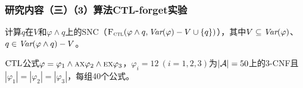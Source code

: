\documentclass[aspectratio=1610, 9pt, CJK]{beamer}
\begin{document}
\begin{frame}
	\frametitle{研究内容（三）（3）算法CTL-forget实验}
		\textcolor{blue!60}{计算$q$在$V$和$\varphi \wedge q$上的SNC（${\textsc{F}_{\textsc{ctl}}}(\varphi\wedge q, \textit{Var}(\varphi)-V \cup \{q\})$），其中$V\subseteq \textit{Var}(\varphi)$、$q\in \textit{Var}(\varphi\wedge q)-V$。}
		
		$\textrm{CTL}$公式$\varphi=\varphi_1 \wedge \textsc{a}\textsc{x} \varphi_2 \wedge \textsc{e}\textsc{x} \varphi_3$，$\varphi_i=12~(i=1,2,3)$为$|{\cal A}|=50$上的3-CNF且$|\varphi_1|=|\varphi_2|=|\varphi_3|$，每组40个公式。
		

\end{frame}
\end{document}
